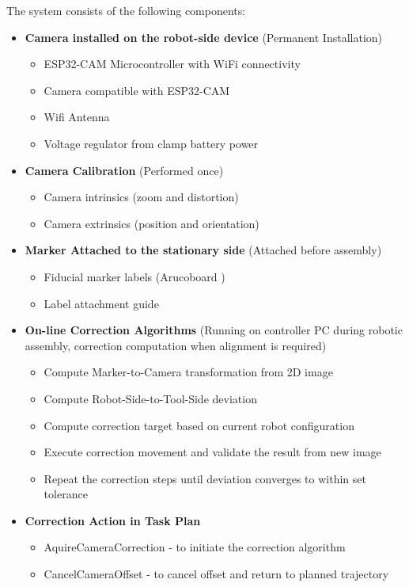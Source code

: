 The system consists of the following components:
\begin{itemize}
    \item \textbf{Camera installed on the robot-side device} (Permanent Installation)
    \begin{itemize}
        \item ESP32-CAM Microcontroller with WiFi connectivity
        \item Camera compatible with ESP32-CAM
        \item Wifi Antenna
        \item Voltage regulator from clamp battery power
    \end{itemize}
    \item \textbf{Camera Calibration} (Performed once)
    \begin{itemize}
        \item Camera intrinsics (zoom and distortion)
        \item Camera extrinsics (position and orientation)
    \end{itemize}
    \item \textbf{Marker Attached to the stationary side} (Attached before assembly)
    \begin{itemize}
        \item Fiducial marker labels (Arucoboard )
        \item Label attachment guide
    \end{itemize}
    \item \textbf{On-line Correction Algorithms} (Running on controller PC during robotic assembly, correction computation when alignment is required)
    \begin{itemize}
        \item Compute Marker-to-Camera transformation from 2D image
        \item Compute Robot-Side-to-Tool-Side deviation
        \item Compute correction target based on current robot configuration
        \item Execute correction movement and validate the result from new image
        \item Repeat the correction steps until deviation converges to within set tolerance
    \end{itemize}
    \item \textbf{Correction Action in Task Plan}
    \begin{itemize}
        \item AquireCameraCorrection - to initiate the correction algorithm
        \item CancelCameraOffset - to cancel offset and return to planned trajectory
    \end{itemize}
\end{itemize}

